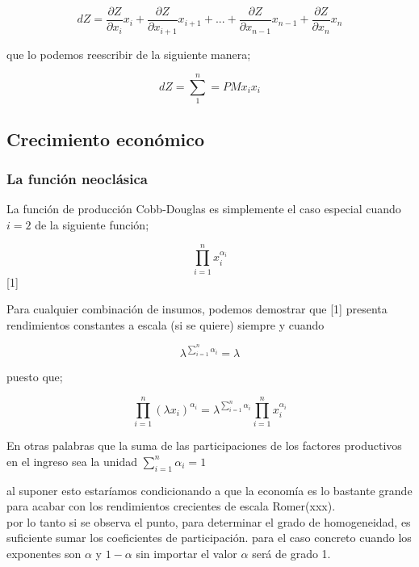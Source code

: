 \documentclass[12pt]{article}
\begin{document}
$$dZ= \dfrac{\partial Z}{ \partial x_{i}} x_{i} + \dfrac{\partial Z}{ \partial x_{i+1}} x_{i+1} +...+\dfrac{\partial Z}{ \partial x_{n-1}} x_{n-1} +\dfrac{\partial Z}{ \partial x_{n}} x_{n}$$

que lo podemos reescribir de la siguiente manera;

$$dZ=\sum_{1}^{n}=PMx_{i}x_{i}$$










\vspace*{0,9cm}

\subsection{Crecimiento económico}


\subsubsection{La función neoclásica}
La función de producción Cobb-Douglas es simplemente el caso especial cuando $i=2$ de la siguiente función;

$$\prod_{i=1}^n x_i^{\alpha_i}  $$ [1]

Para cualquier combinación de insumos, podemos demostrar que [1] presenta rendimientos constantes a escala (si se quiere) siempre y cuando 

 $$ \lambda^{\sum_{i=1}^n\alpha{_i}}=\lambda $$
 
 
puesto que; 



$$\prod_{i=1}^n \left(\lambda x_i \right)^{\alpha_i}=\lambda^{{\sum_{i=1}^n\alpha_i}}\prod_{i=1}^n x_i^{\alpha_i}$$
 
 
 
 
 En otras palabras que la suma de las participaciones de los factores productivos en el ingreso sea la unidad $\sum_{i=1}^n\alpha{_i}=1$
 
 al suponer esto estaríamos condicionando a que la economía es lo bastante grande para acabar con los rendimientos crecientes de escala Romer(xxx).
\\ 
 
 por lo tanto si se observa el punto, para determinar el grado de homogeneidad, es suficiente sumar los coeficientes de participación.
para el caso concreto cuando los exponentes son $\alpha$ y $1-\alpha$ sin importar el valor $\alpha$ será de grado 1. 
\end{document}
